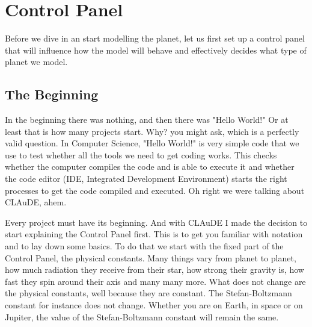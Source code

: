 \section{Control Panel} \label{sec:cp}
Before we dive in an start modelling the planet, let us first set up a control panel that will influence how the model will behave and effectively decides what type of planet we model.

\subsection{The Beginning}
In the beginning there was nothing, and then there was "Hello World!" Or at least that is how many projects start. Why? you might ask, which is a perfectly valid question. In Computer Science, 
"Hello World!" is very simple code that we use to test whether all the tools we need to get coding works. This checks whether the computer compiles the code and is able to execute it and whether 
the code editor (IDE, Integrated Development Environment) starts the right processes to get the code compiled and executed. Oh right we were talking about CLAuDE, ahem.

Every project must have its beginning. And with CLAuDE I made the decision to start explaining the Control Panel first. This is to get you familiar with notation and to lay down some basics. To 
do that we start with the fixed part of the Control Panel, the physical constants. Many things vary from planet to planet, how much radiation they receive from their star, how strong their 
gravity is, how fast they spin around their axis and many many more. What does not change are the physical constants, well because they are constant. The Stefan-Boltzmann constant for instance
does not change. Whether you are on Earth, in space or on Jupiter, the value of the Stefan-Boltzmann constant will remain the same. 

